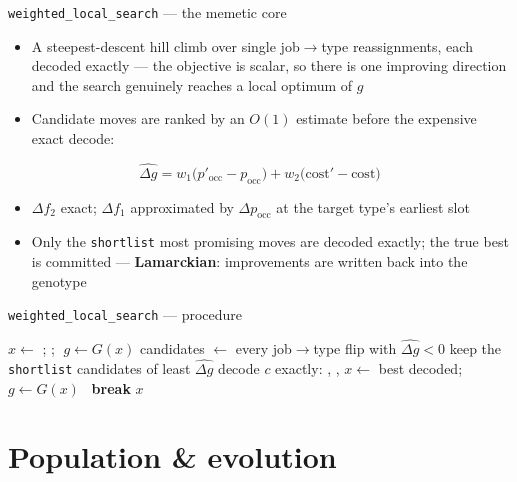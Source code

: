 \documentclass[aspectratio=169,t]{beamer}
\newcommand{\code}[1]{\texttt{#1}}
\newcommand{\g}{\ensuremath{g}\xspace}
\begin{document}
\begin{frame}{\code{weighted\_local\_search} --- the memetic core}
  \begin{itemize}
    \item A \alert{steepest-descent hill climb} over single job$\to$type
      reassignments, each decoded exactly --- the objective is scalar, so
      there is one improving direction and the search genuinely reaches a
      local optimum of \g
    \item Candidate moves are ranked by an $O(1)$ estimate before the
      expensive exact decode:
  \end{itemize}
  \[
    \widehat{\Delta g} = w_1\big(p'_{\text{occ}} - p_{\text{occ}}\big)
                        + w_2\big(\text{cost}' - \text{cost}\big)
  \]
  \begin{itemize}
    \item $\Delta f_2$ exact; $\Delta f_1$ approximated by $\Delta p_{\text{occ}}$
      at the target type's earliest slot
    \item Only the \code{shortlist} most promising moves are decoded exactly;
      the true best is committed --- \textbf{Lamarckian}: improvements are
      written back into the genotype
  \end{itemize}
\end{frame}

\begin{frame}{\code{weighted\_local\_search} --- procedure}
  \footnotesize
  \begin{algorithmic}[1]
      \State $x \leftarrow$ ; ; $\;g \leftarrow G(x)$
        \State candidates $\leftarrow$ every job$\to$type flip with $\widehat{\Delta g} < 0$
        \State keep the \texttt{shortlist} candidates of least $\widehat{\Delta g}$
          \State decode $c$ exactly: , , 
        \EndFor
          \State $x \leftarrow$ best decoded; $g \leftarrow G(x)$
        \Else\ \textbf{break}
        \EndIf
      \EndFor
      \State \Return $x$
    \EndProcedure
  \end{algorithmic}
\end{frame}

\section{Population \& evolution}
\end{document}
